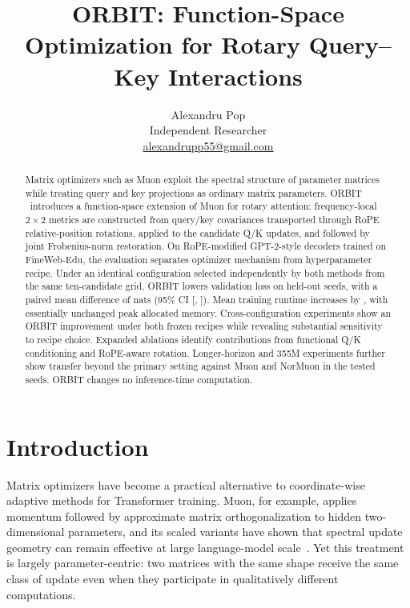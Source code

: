 \documentclass[10pt]{article}
\title{ORBIT: Function-Space Optimization for Rotary Query--Key Interactions}
\author{Alexandru Pop\\[-0.1em]\small Independent Researcher\\[-0.1em]\small \href{mailto:alexandrupp55@gmail.com}{alexandrupp55@gmail.com}\\[-0.15em]\small \href{https://github.com/pop123-ux}{\faGithub}}
\date{}
\begin{document}
\maketitle

\begin{abstract}
Matrix optimizers such as Muon exploit the spectral structure of parameter matrices while
treating query and key projections as ordinary matrix parameters. ORBIT\,\href{https://github.com/pop123-ux/ORBIT}{\faGithub}\ introduces a
function-space extension of Muon for rotary attention: frequency-local $2\times2$ metrics
are constructed from query/key covariances transported through RoPE relative-position
rotations, applied to the candidate Q/K updates, and followed by joint Frobenius-norm
restoration. On RoPE-modified GPT-2-style decoders trained on FineWeb-Edu, the evaluation
separates optimizer mechanism from hyperparameter recipe. Under an identical configuration
selected independently by both methods from the same ten-candidate grid, ORBIT lowers
validation loss on \MatchedWins{} held-out seeds, with a paired mean difference of
\MatchedDelta{} nats (95\% CI [\MatchedCILow{}, \MatchedCIHigh{}]). Mean training
runtime increases by \MatchedRuntimeOverhead{}, with essentially unchanged peak allocated
memory. Cross-configuration experiments show an ORBIT improvement under both frozen
recipes while revealing substantial sensitivity to recipe choice. Expanded ablations
identify contributions from functional Q/K conditioning and RoPE-aware rotation.
Longer-horizon and 355M experiments further show transfer beyond the primary setting
against Muon and NorMuon in the tested seeds. ORBIT changes no inference-time computation.
\end{abstract}

\section{Introduction}
Matrix optimizers have become a practical alternative to coordinate-wise adaptive methods
for Transformer training. Muon, for example, applies momentum followed by approximate
matrix orthogonalization to hidden two-dimensional parameters, and its scaled variants have
shown that spectral update geometry can remain effective at large language-model
scale~\cite{jordan2024muon,liu2025muon}. Yet this treatment is largely parameter-centric:
two matrices with the same shape receive the same class of update even when they participate
in qualitatively different computations.
\end{document}

